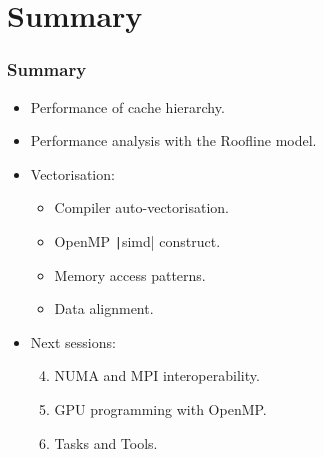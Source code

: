 \documentclass{beamer}
\begin{document}
\section{Summary}
\begin{frame}
\frametitle{Summary}

\begin{itemize}
  \item Performance of cache hierarchy.
  \item Performance analysis with the Roofline model.
  \item Vectorisation:
    \begin{itemize}
      \item Compiler auto-vectorisation.
      \item OpenMP \texttt|simd| construct.
      \item Memory access patterns.
      \item Data alignment.
    \end{itemize}

  \vfill

  \item Next sessions:
    \begin{enumerate}
      \setcounter{enumi}{3}
      \item NUMA and MPI interoperability.
      \item GPU programming with OpenMP.
      \item Tasks and Tools.
    \end{enumerate}
\end{itemize}


\end{frame}

\end{document}
